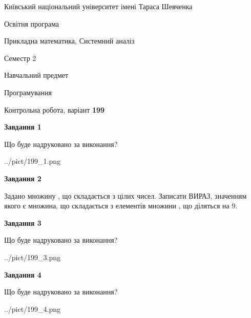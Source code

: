 \documentclass[12pt, ukrainian]{article}
\begin{document}
{{\begin {small}\par
{ \center  Київський національний університет імені Тараса Шевченка \par}
{\parbox {5 cm}{Освітня програма \hfill}{\parbox {8 cm}{Прикладна математика, Системний аналіз \hfill}}\parbox {5 cm}{\hfill Семестр 2}}\par
{\parbox {5 cm} {Навчальний предмет \hfill}\parbox {7 cm}{Програмування \hfill}\parbox {6cm}{\hfill}\par}\vspace{-7pt} \end{small}}{\center Контрольна робота, варіант  \No \textbf
{ 199 }\par}}
{
\begin {large}
{\begin {center}\textbf{Завдання 1}\end {center}}\par
Що буде надруковано за виконання?\par\par
\begin{center}
	{../pict/199_1.png}
\end{center}
\newpage

{\begin {center}\textbf{Завдання 2}\end {center}}\par
Задано множину , що складається з цілих чисел. Записати ВИРАЗ, значенням якого є множина, що складається  з елементів множини , що діляться на 9.\par
\newpage

{\begin {center}\textbf{Завдання 3}\end {center}}\par
Що буде надруковано за виконання?
\begin{center}
	{../pict/199_3.png}
\end{center}
\newpage

{\begin {center}\textbf{Завдання 4}\end {center}}\par
Що буде надруковано за виконання?\par
\begin{center}
	{../pict/199_4.png}
\end{center}
\newpage


\end{large}}
\end{document}
